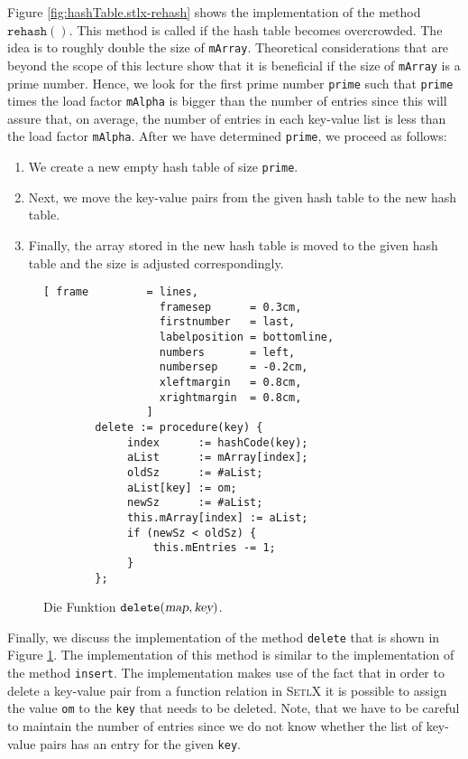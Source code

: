 Figure \ref{fig:hashTable.stlx-rehash} shows the implementation of the method
$\mathtt{rehash}()$.  This method is called if the hash table becomes overcrowded.  The idea is to
roughly double the size of \texttt{mArray}.  Theoretical considerations that are  beyond the scope
of this lecture show that it is beneficial if the size of \texttt{mArray} is a prime number.
Hence, we look for the first prime number \texttt{prime} such that \texttt{prime} times the load
factor \texttt{mAlpha} is bigger than the
number of entries since this will assure that, on average, the number of entries in each key-value
list is less than the load factor \texttt{mAlpha}.  After we have determined \texttt{prime}, we
proceed as follows: 
\begin{enumerate}
\item We create a new empty hash table of size \texttt{prime}.
\item Next, we move the key-value pairs from the given hash table to the new hash table.
\item Finally, the array stored in the new hash table is moved to the given hash table
      and the size is adjusted correspondingly.
\end{enumerate}





\begin{figure}[!ht]
\centering
\begin{Verbatim}[ frame         = lines, 
                  framesep      = 0.3cm, 
                  firstnumber   = last,
                  labelposition = bottomline,
                  numbers       = left,
                  numbersep     = -0.2cm,
                  xleftmargin   = 0.8cm,
                  xrightmargin  = 0.8cm,
                ]
        delete := procedure(key) {
             index      := hashCode(key);
             aList      := mArray[index];
             oldSz      := #aList;
             aList[key] := om;
             newSz      := #aList;
             this.mArray[index] := aList;
             if (newSz < oldSz) {
                 this.mEntries -= 1;
             }    
        };
\end{Verbatim}
\vspace*{-0.3cm}
\caption{Die Funktion $\mathtt{delete}(\textsl{map}, \textsl{key})$.}
\label{fig:hashTable.stlx-delete}
\end{figure}

Finally, we discuss the implementation of the method \texttt{delete} that is shown in Figure
\ref{fig:hashTable.stlx-delete}.  The implementation of this method is similar to the implementation
of the method \texttt{insert}.   The implementation makes use of the fact that in order to delete
a key-value pair from a function relation in \textsc{SetlX} it is possible to assign the value
\texttt{om} to the \texttt{key} that needs to be deleted. Note, that we have to be careful to
maintain the number of entries since we do not know whether the list of key-value pairs has an entry
for the given \texttt{key}.

